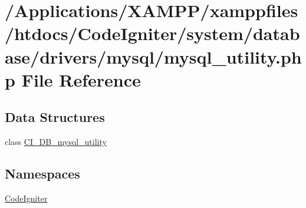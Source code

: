 \hypertarget{mysql__utility_8php}{}\section{/\+Applications/\+X\+A\+M\+P\+P/xamppfiles/htdocs/\+Code\+Igniter/system/database/drivers/mysql/mysql\+\_\+utility.php File Reference}
\label{mysql__utility_8php}
\subsection*{Data Structures}
\begin{DoxyCompactItemize}
\item 
class \mbox{\hyperlink{class_c_i___d_b__mysql__utility}{C\+I\+\_\+\+D\+B\+\_\+mysql\+\_\+utility}}
\end{DoxyCompactItemize}
\subsection*{Namespaces}
\begin{DoxyCompactItemize}
\item 
 \mbox{\hyperlink{namespace_code_igniter}{Code\+Igniter}}
\end{DoxyCompactItemize}
